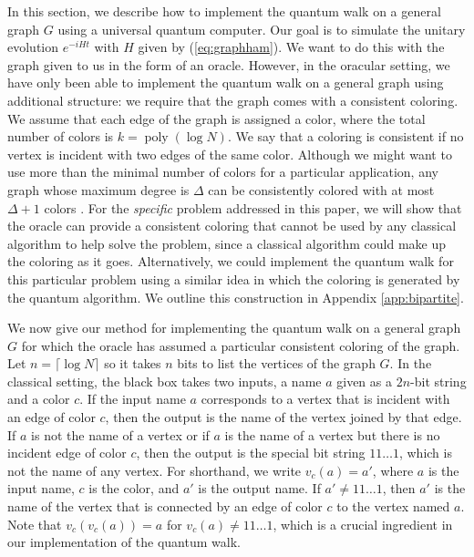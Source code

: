 \documentclass[aps,11pt,twoside,nofootinbib,tightenlines,superscriptaddress,preprintnumbers]{revtex4}
\newcommand{\<}{\langle}
\renewcommand{\>}{\rangle}
\newcommand{\poly}{\mathop{\mathrm{poly}}\nolimits}
\begin{document}
In this section, we describe how to implement the quantum walk on a
general graph $G$ using a universal quantum computer.  Our goal is to
simulate the unitary evolution $e^{-i H t}$ with $H$ given by
(\ref{eq:graphham}).  We want to do this with the graph given to us in the
form of an oracle.  However, in the oracular setting, we have only been
able to implement the quantum walk on a general graph using additional
structure: we require that the graph comes with a consistent coloring.  We
assume that each edge of the graph is assigned a color, where the total
number of colors is $k=\poly(\log N)$.  We say that a coloring is
consistent if no vertex is incident with two edges of the same color.
Although we might want to use more than the minimal number of colors for a
particular application, any graph whose maximum degree is $\Delta$ can be
consistently colored with at most $\Delta+1$ colors \cite{Viz64}.  For the
{\it specific} problem addressed in this paper, we will show that the
oracle can provide a consistent coloring that cannot be used by any
classical algorithm to help solve the problem, since a classical algorithm
could make up the coloring as it goes.  Alternatively, we could implement
the quantum walk for this particular problem using a similar idea in which
the coloring is generated by the quantum algorithm.  We outline this
construction in Appendix \ref{app:bipartite}.

We now give our method for implementing the quantum walk on a general
graph $G$ for which the oracle has assumed a particular consistent
coloring of the graph.  Let $n=\lceil \log N \rceil$ so it takes $n$ bits
to list the vertices of the graph $G$.  In the classical setting, the
black box takes two inputs, a name $a$ given as a $2n$-bit string and a
color $c$.  If the input name $a$ corresponds to a vertex that is incident
with an edge of color $c$, then the output is the name of the vertex
joined by that edge.  If $a$ is not the name of a vertex or if $a$ is the
name of a vertex but there is no incident edge of color $c$, then the
output is the special bit string $11\ldots1$, which is not the name of any
vertex.  For shorthand, we write $v_c(a)=a'$, where $a$ is the input name,
$c$ is the color, and $a'$ is the output name.  If $a' \ne 11\ldots1$,
then $a'$ is the name of the vertex that is connected by an edge of color
$c$ to the vertex named $a$.  Note that $v_c(v_c(a))=a$ for $v_c(a) \ne
11\ldots1$, which is a crucial ingredient in our implementation of the
quantum walk.
\end{document}

